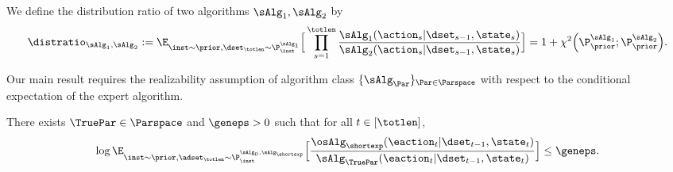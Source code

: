 \documentclass[10pt]{article}
\newcommand{\authnote}[2]{{\scriptsize $\ll$\textsf{#1 notes: #2}$\gg$}}
\newcommand{\authnote}[2]{}
\newcommand{\yub}[1]{{\color{red}\authnote{Yu}{#1}}}
\newcommand{\lc}[1]{{\color{blue}\authnote{Licong}{#1}}}
\begin{document}
\begin{definition}\label{def:dist_ratio}
\label{def:distribution-ratio}
We define the distribution ratio of two algorithms $\sAlg_1,\sAlg_2$ by
\begin{align*}\distratio_{\sAlg_1,\sAlg_2}
:=
\E_{\inst\sim\prior,\dset_\totlen\sim\P_\inst^{\sAlg_1}}
\Big[\prod_{s=1}^{\totlen}\frac{\sAlg_1(\action_s|\dset_{s-1},\state_s)}{\sAlg_2(\action_s|\dset_{s-1},\state_s)}\Big] = 1 + \chi^2\Big( \P_\prior^{\sAlg_1};\P_\prior^{\sAlg_2} \Big).
\end{align*}
\end{definition}


Our main result requires the realizability assumption of algorithm class $\{ \sAlg_\Par\}_{\Par \in \Parspace}$ with respect to the conditional expectation of the expert algorithm. 

\begin{assumption}
\label{asp:realizability}
There exists $\TruePar\in\Parspace$ and $\geneps > 0$ such that for all $t\in[\totlen]$, 
\begin{align}
\label{eqn:plc_approx_general}
\log\E_{\inst \sim \prior, \adset_\totlen \sim \P_{\inst}^{\sAlg_0,\sAlg_\shortexp}}\Big[\frac{\osAlg_{\shortexp}(\eaction_t|\dset_{t-1},\state_t )}{\sAlg_\TruePar(\eaction_t|\dset_{t-1},\state_t )}\Big] \le \geneps. 
\end{align}
\end{assumption}

\end{document}

